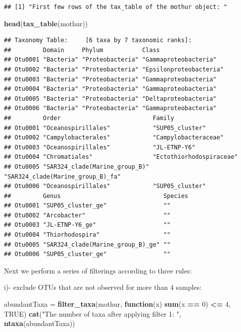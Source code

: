 \documentclass[11 pt,]{article}
\newenvironment{Shaded}{\begin{snugshade}}{\end{snugshade}}
\newcommand{\KeywordTok}[1]{\textcolor[rgb]{0.13,0.29,0.53}{\textbf{#1}}}
\newcommand{\DecValTok}[1]{\textcolor[rgb]{0.00,0.00,0.81}{#1}}
\newcommand{\StringTok}[1]{\textcolor[rgb]{0.31,0.60,0.02}{#1}}
\newcommand{\OtherTok}[1]{\textcolor[rgb]{0.56,0.35,0.01}{#1}}
\newcommand{\ControlFlowTok}[1]{\textcolor[rgb]{0.13,0.29,0.53}{\textbf{#1}}}
\newcommand{\OperatorTok}[1]{\textcolor[rgb]{0.81,0.36,0.00}{\textbf{#1}}}
\newcommand{\NormalTok}[1]{#1}
\begin{document}
\begin{verbatim}
## [1] "First few rows of the tax_table of the mothur object: "
\end{verbatim}

\begin{Shaded}
\begin{Highlighting}[]
\KeywordTok{head}\NormalTok{(}\KeywordTok{tax_table}\NormalTok{(mothur))}
\end{Highlighting}
\end{Shaded}

\begin{verbatim}
## Taxonomy Table:     [6 taxa by 7 taxonomic ranks]:
##         Domain     Phylum           Class                  
## Otu0001 "Bacteria" "Proteobacteria" "Gammaproteobacteria"  
## Otu0002 "Bacteria" "Proteobacteria" "Epsilonproteobacteria"
## Otu0003 "Bacteria" "Proteobacteria" "Gammaproteobacteria"  
## Otu0004 "Bacteria" "Proteobacteria" "Gammaproteobacteria"  
## Otu0005 "Bacteria" "Proteobacteria" "Deltaproteobacteria"  
## Otu0006 "Bacteria" "Proteobacteria" "Gammaproteobacteria"  
##         Order                          Family                           
## Otu0001 "Oceanospirillales"            "SUP05_cluster"                  
## Otu0002 "Campylobacterales"            "Campylobacteraceae"             
## Otu0003 "Oceanospirillales"            "JL-ETNP-Y6"                     
## Otu0004 "Chromatiales"                 "Ectothiorhodospiraceae"         
## Otu0005 "SAR324_clade(Marine_group_B)" "SAR324_clade(Marine_group_B)_fa"
## Otu0006 "Oceanospirillales"            "SUP05_cluster"                  
##         Genus                             Species
## Otu0001 "SUP05_cluster_ge"                ""     
## Otu0002 "Arcobacter"                      ""     
## Otu0003 "JL-ETNP-Y6_ge"                   ""     
## Otu0004 "Thiorhodospira"                  ""     
## Otu0005 "SAR324_clade(Marine_group_B)_ge" ""     
## Otu0006 "SUP05_cluster_ge"                ""
\end{verbatim}

Next we perform a series of filterings according to three rules:

i)- exclude OTUs that are not observed for more than \(4\) samples:

\begin{Shaded}
\begin{Highlighting}[]
\NormalTok{abundantTaxa =}\StringTok{ }\KeywordTok{filter_taxa}\NormalTok{(mothur, }\ControlFlowTok{function}\NormalTok{(x) }\KeywordTok{sum}\NormalTok{(x }\OperatorTok{==}\StringTok{ }\DecValTok{0}\NormalTok{) }\OperatorTok{<=}\StringTok{ }\DecValTok{4}\NormalTok{, }\OtherTok{TRUE}\NormalTok{)}
\KeywordTok{cat}\NormalTok{(}\StringTok{"The number of taxa after applying filter 1: "}\NormalTok{, }\KeywordTok{ntaxa}\NormalTok{(abundantTaxa))}
\end{Highlighting}
\end{Shaded}
\end{document}
